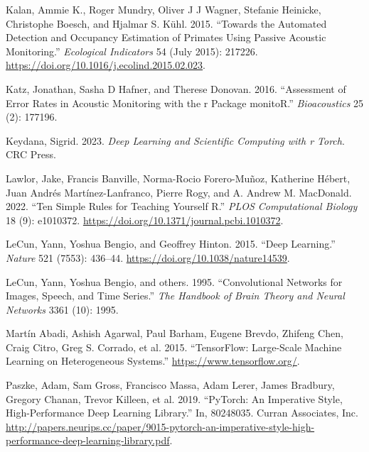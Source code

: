 \documentclass{article}
\newlength{\cslhangindent}
\newlength{\cslentryspacingunit} %
\newenvironment{CSLReferences}[2] %
 {%
  \setlength{\parindent}{0pt}
  \ifodd #1
  \let\oldpar\par
  \def\par{\hangindent=\cslhangindent\oldpar}
  \fi
  \setlength{\parskip}{#2\cslentryspacingunit}
 }%
 {}
\begin{document}
\begin{CSLReferences}{1}{0}
\leavevmode{}%
Kalan, Ammie K., Roger Mundry, Oliver J J Wagner, Stefanie Heinicke,
Christophe Boesch, and Hjalmar S. Kühl. 2015. {``Towards the Automated
Detection and Occupancy Estimation of Primates Using Passive Acoustic
Monitoring.''} \emph{Ecological Indicators} 54 (July 2015): 217226.
\url{https://doi.org/10.1016/j.ecolind.2015.02.023}.

\leavevmode{}%
Katz, Jonathan, Sasha D Hafner, and Therese Donovan. 2016. {``Assessment
of Error Rates in Acoustic Monitoring with the r Package monitoR.''}
\emph{Bioacoustics} 25 (2): 177196.

\leavevmode{}%
Keydana, Sigrid. 2023. \emph{Deep Learning and Scientific Computing with
r Torch}. CRC Press.

\leavevmode{}%
Lawlor, Jake, Francis Banville, Norma-Rocio Forero-Muñoz, Katherine
Hébert, Juan Andrés Martínez-Lanfranco, Pierre Rogy, and A. Andrew M.
MacDonald. 2022. {``Ten Simple Rules for Teaching Yourself R.''}
\emph{PLOS Computational Biology} 18 (9): e1010372.
\url{https://doi.org/10.1371/journal.pcbi.1010372}.

\leavevmode{}%
LeCun, Yann, Yoshua Bengio, and Geoffrey Hinton. 2015. {``Deep
Learning.''} \emph{Nature} 521 (7553): 436--44.
\url{https://doi.org/10.1038/nature14539}.

\leavevmode{}%
LeCun, Yann, Yoshua Bengio, and others. 1995. {``Convolutional Networks
for Images, Speech, and Time Series.''} \emph{The Handbook of Brain
Theory and Neural Networks} 3361 (10): 1995.

\leavevmode{}%
Martín Abadi, Ashish Agarwal, Paul Barham, Eugene Brevdo, Zhifeng Chen,
Craig Citro, Greg S. Corrado, et al. 2015. {``TensorFlow: Large-Scale
Machine Learning on Heterogeneous Systems.''}
\url{https://www.tensorflow.org/}.

\leavevmode{}%
Paszke, Adam, Sam Gross, Francisco Massa, Adam Lerer, James Bradbury,
Gregory Chanan, Trevor Killeen, et al. 2019. {``PyTorch: An Imperative
Style, High-Performance Deep Learning Library.''} In, 80248035. Curran
Associates, Inc.
\url{http://papers.neurips.cc/paper/9015-pytorch-an-imperative-style-high-performance-deep-learning-library.pdf}.


\end{CSLReferences}
\end{document}
